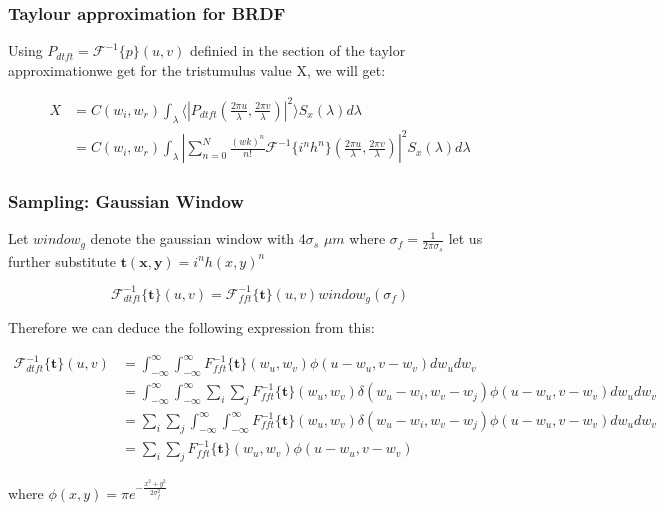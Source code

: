 \subsubsection{Taylour approximation for BRDF}
Using $P_{dtft} = \mathcal{F}^{-1}\{p\}(u,v)$ definied in the section of the taylor approximationwe get for the tristumulus value X, we will get:

\begin{align*}
X 
& = C(w_i,w_r) \int_{\lambda} \langle \left|P_{dtft}(\frac{2\pi u}{\lambda}, \frac{2\pi v}{\lambda})\right|^2\rangle S_x(\lambda)d\lambda \\
& = C(w_i,w_r) \int_{\lambda} \left| \sum_{n=0}^N \frac{(wk)^n}{n!} \mathcal{F}^{-1}\{i^n h^n\}(\frac{2\pi u}{\lambda}, \frac{2\pi v}{\lambda})\right|^2 S_x(\lambda)d\lambda
\end{align*}


\subsubsection{Sampling: Gaussian Window}


Let $window_g$ denote the gaussian window with $4\sigma_s$ $\mu m$ where $\sigma_f = \frac{1}{2\pi\sigma_s}$
let us further substitute $\mathbf{t(x,y)}=i^n h(x,y)^n$

\begin{equation}
\mathcal{F}_{dtft}^{-1}\{\mathbf{t}\}(u,v) = \mathcal{F}_{fft}^{-1}\{\mathbf{t}\}(u,v)window_g(\sigma_f)
\end{equation} 

Therefore we can deduce the following expression from this:

\begin{align*}
\mathcal{F}_{dtft}^{-1}\{\mathbf{t}\}(u,v)
& = \int_{-\infty}^{\infty} \int_{-\infty}^{\infty} {F}_{fft}^{-1}\{\mathbf{t}\}(w_u,w_v) \phi(u-w_u, v-w_v) dw_u dw_v \\
& = \int_{-\infty}^{\infty} \int_{-\infty}^{\infty} \sum_i \sum_j {F}_{fft}^{-1}\{\mathbf{t}\}(w_u,w_v) \delta(w_u-w_i, w_v-w_j)\phi(u-w_u, v-w_v) dw_u dw_v \\
& = \sum_i \sum_j \int_{-\infty}^{\infty} \int_{-\infty}^{\infty}  {F}_{fft}^{-1}\{\mathbf{t}\}(w_u,w_v) \delta(w_u-w_i, w_v-w_j)\phi(u-w_u, v-w_v) dw_u dw_v \\
& = \sum_i \sum_j {F}_{fft}^{-1}\{\mathbf{t}\}(w_u,w_v) \phi(u-w_u, v-w_v)
\end{align*}

where $\phi(x,y) = \pi e^{-\frac{x^2 + y^2}{2\sigma_{f}^2}}$

